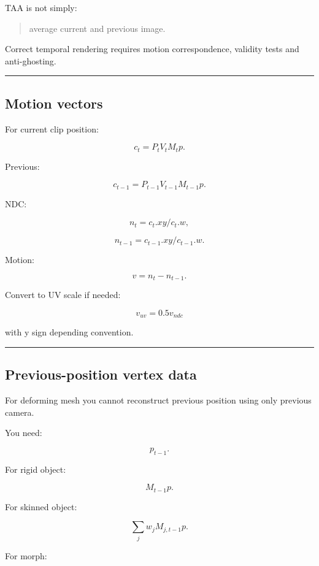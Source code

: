 TAA is not simply:

\begin{quote}
average current and previous image.
\end{quote}

Correct temporal rendering requires motion correspondence, validity tests and anti-ghosting.

\begin{center}\rule{0.5\linewidth}{0.5pt}\end{center}

\subsection{Motion vectors}\label{04-visual-computing-ii-ch040-motion-vectors}

For current clip position:

\[
c_t=
P_tV_tM_tp.
\]

Previous:

\[
c_{t-1}
=
P_{t-1}
V_{t-1}
M_{t-1}
p.
\]

NDC:

\[
n_t=
c_t.xy/c_t.w,
\]

\[
n_{t-1}
=
c_{t-1}.xy/c_{t-1}.w.
\]

Motion:

\[
\boxed{
v=
n_t-n_{t-1}.
}
\]

Convert to UV scale if needed:

\[
v_{uv}=0.5v_{ndc}
\]

with y sign depending convention.

\begin{center}\rule{0.5\linewidth}{0.5pt}\end{center}

\subsection{Previous-position vertex data}\label{04-visual-computing-ii-ch040-previous-position-vertex-data}

For deforming mesh you cannot reconstruct previous position using only previous camera.

You need:

\[
p_{t-1}.
\]

For rigid object:

\[
M_{t-1}p.
\]

For skinned object:

\[
\sum_j
w_j
M_{j,t-1}p.
\]

For morph:

